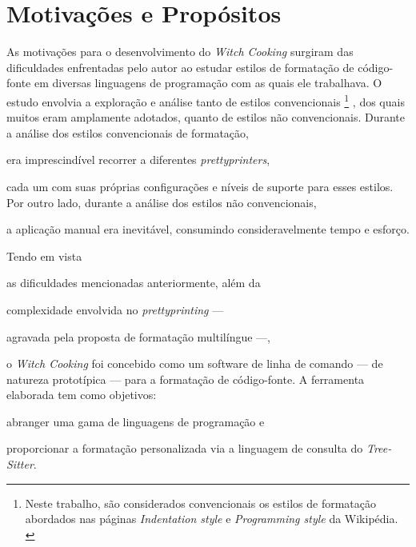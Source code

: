 \documentclass
  [11pt,a4paper,english,brazil,openright,sumario=tradicional,twoside]
  {abntex2}
\newcommand{\treesitter}{\textit{Tree-Sitter}\xspace}
\newcommand{\witchcooking}{\textit{Witch Cooking}\xspace}
\begin{document}
  \section{Motivações e Propósitos}

  As motivações para o desenvolvimento do \witchcooking surgiram das
  dificuldades enfrentadas pelo autor ao estudar estilos de formatação de
  código-fonte em diversas linguagens de programação com as quais ele
  trabalhava. O estudo envolvia a exploração e análise tanto de estilos
  convencionais%
  \footnote
    { Neste trabalho, são considerados convencionais os estilos de formatação
      abordados nas páginas \textit{Indentation style} e
      \textit{Programming style} da Wikipédia.
      \cites{wiki-2023-indentation}{wiki-2023-programming}}%
  , dos quais muitos eram amplamente adotados, quanto de estilos
  não convencionais. Durante a análise dos estilos convencionais de formatação,
  \begin{inparaenum}
    \item era imprescindível recorrer a diferentes \textit{prettyprinters},
    \item cada um com suas próprias configurações e níveis de suporte para
          esses estilos. Por outro lado, durante a análise dos estilos
          não convencionais,
    \item a aplicação manual era inevitável, consumindo consideravelmente tempo
          e esforço.
  \end{inparaenum}

  Tendo em vista
  \begin{inparaenum}
    \item as dificuldades mencionadas anteriormente, além da
    \item complexidade envolvida no \textit{prettyprinting} ---
    \item agravada pela proposta de formatação multilíngue ---,
  \end{inparaenum}
  o \witchcooking foi concebido como um software de linha de comando --- de
  natureza prototípica --- para a formatação de código-fonte. A ferramenta
  elaborada tem como objetivos:
  \begin{inparaenum}
    \item abranger uma gama de linguagens de programação e
    \item proporcionar a formatação personalizada via a linguagem de consulta
          do \treesitter.
  \end{inparaenum}
\end{document}
